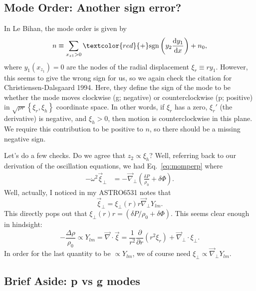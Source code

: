 \documentclass[11pt,
        usenames, %
        twocolumn,
        landscape,
        dvipsnames %
    ]{article}
\newcommand*{\rd}[2]{\frac{\mathrm{d}#1}{\mathrm{d}#2}}
\newcommand*{\pd}[2]{\frac{\partial#1}{\partial#2}}
\newcommand*{\p}[1]{\left(#1\right)}
\newcommand*{\z}[1]{\left\{#1\right\}}
\begin{document}
\subsection{Mode Order: Another sign error?}

In Le Bihan, the mode order is given by
\begin{equation}
    n \equiv \sum\limits_{x_{z1} > 0} \textcolor{red}{+}
        \mathrm{sgn}\p{y_2\rd{y_1}{x}} + n_0,
\end{equation}
where $y_1\p{x_{z_1}} = 0$ are the nodes of the radial displacement $\xi_r
\equiv ry_1$. However, this seems to give the wrong sign for us, so we again
check the citation for Christiensen-Dalsgaard 1994. Here, they define the sign
of the mode to be whether the mode moves clockwise (g; negative) or
counterclockwise (p; positive) in $\sqrt{\rho r}\z{\xi_r, \xi_h}$ coordinate
space. In other words, if $\xi_r$ has a zero, $\xi_r'$ (the derivative) is
negative, and $\xi_h > 0$, then motion is counterclockwise in this plane. We
require this contribution to be positive to $n$, so there should be a missing
negative sign.

Let's do a few checks. Do we agree that $z_2 \propto \xi_h$? Well, referring
back to our derivation of the oscillation equations, we had
Eq.~\eqref{eq:momperp} where
\begin{align}
    -\omega^2\vec{\xi}_\perp &= -\vec{\nabla}_\perp
        \p{\frac{\delta P}{\rho_0} + \delta \Phi}.
\end{align}
Well, actually, I noticed in my ASTRO6531 notes that
\begin{equation}
    \vec{\xi}_\perp = \xi_\perp(r)r\vec{\nabla}_\perp Y_{lm}.
\end{equation}
This directly pops out that $\xi_\perp(r)r = \p{\delta P / \rho_0 + \delta
\Phi}$. This seems clear enough in hindsight:
\begin{equation}
    -\frac{\Delta \rho}{\rho_0} \propto Y_{lm}
        = \vec{\nabla} \cdot \vec{\xi}
        = \frac{1}{r^2}\pd{}{r}\p{r^2\xi_r}
            + \vec{\nabla}_\perp \cdot \xi_\perp.
\end{equation}
In order for the last quantity to be $\propto Y_{lm}$, we of course need
$\xi_\perp \propto \vec{\nabla}_\perp Y_{lm}$.

\subsection{Brief Aside: p vs g modes}
\end{document}
